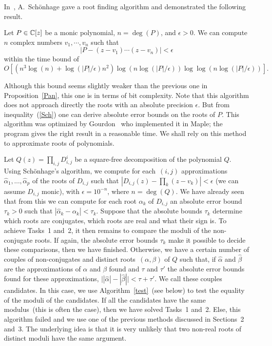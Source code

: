 In~\cite{Schonhage82}, A.~Sch\"onhage gave a root finding algorithm and
demonstrated the following result.
\begin{th} Let $P \in {\Bbb C}[z]$ be a monic polynomial,
$n=\deg(P)$, and
$\epsilon>0$. We can compute $n$ complex numbers $v_1,\cdots,v_n$ such
that
\begin{equation} \label{Sch}
|P-(z-v_1)\cdots (z-v_n)|<\epsilon
\end{equation}
within the time bound of $O\left[ (n^3\log(n)+\log(|P|/\epsilon) n^2)
\log(n \log(|P|/\epsilon)) \log \log(n \log(|P|/\epsilon))\right].$
\end{th}
Although this bound seems slightly weaker than the previous one in
Proposition~\ref{Pan}, this one is in terms of bit complexity.
Note that this algorithm does not approach directly
the roots with an absolute precision $\epsilon$. But from
inequality~(\ref{Sch}) one can  derive absolute error bounds on the
roots of $P$. This algorithm was optimized by Gourdon~\cite{Gourdon92} who
implemented 
it in {\sc Maple}; the program gives the right result in a reasonable
time. We shall rely on this method to approximate roots of
polynomials.
\par Let $Q(z)=\prod_{i,j} D_{i,j}^i$ be a
square-free decomposition of the polynomial $Q$.
Using Sch\"onhage's algorithm, we compute for each~$(i,j)$
approximations $\hat\alpha_1,\ldots,\hat\alpha_p$ of the roots of
$D_{i,j}$ such that $|D_{i,j}(z)-\prod_k (z-v_k)|<\epsilon$ (we
can assume $D_{i,j}$ monic), with $\epsilon=10^{-n}$, where
$n=\deg(Q)$.
We have already seen that from this we can compute for each root $\alpha_k$ of
$D_{i,j}$ an absolute error bound $\tau_k>0$ such that
$|\hat\alpha_k -\alpha_k|<\tau_k$.  Suppose that 
 the absolute  bounds $\tau_k$ determine
which roots are conjugates, which roots are real and what their sign is.
To achieve Tasks~1 and~2, it then remains to compare the moduli of the
non-conjugate roots. If again, the absolute error bounds $\tau_k$
make it possible to decide these comparisons, then we have finished. Otherwise,
we have a certain number of couples of non-conjugates and distinct
roots~$(\alpha,\beta)$ of $Q$ such that, if $\hat{\alpha}$ and
$\hat{\beta}$ are the approximations of $\alpha$ and $\beta$ found and
$\tau$ and $\tau'$ the absolute error bounds found for these
approximations, $\bigl||\hat{\alpha}|-|\hat{\beta}|\bigr|<\tau+\tau'$. We call
these couples candidates. In this case, we use 
Algorithm~\ref{test}~(see below) to test the equality of the moduli of the
candidates. If all the candidates have the same modulus~(this is often the
case), then we have solved Tasks~1 and~2. Else, this algorithm
failed and we use one of the previous methods discussed in Sections~2
and~3. The underlying idea is that it is very unlikely that two
non-real roots of distinct moduli have the same argument.

